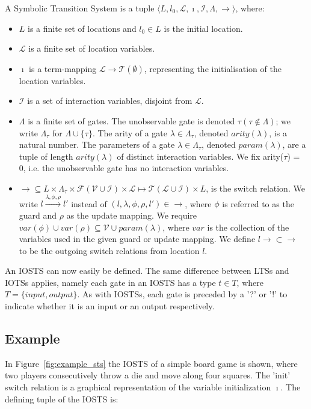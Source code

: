 \begin{definition}
A Symbolic Transition System is a tuple $\langle L,l_0,\mathcal{L},\imath,\mathcal{I},\Lambda,\rightarrow\rangle$, where:
\begin{itemize}
\item $L$ is a finite set of locations and $l_0 \in L$ is the initial location.
\item $\mathcal{L}$ is a finite set of location variables.
\item $\imath$ is a term-mapping $\mathcal{L} \rightarrow \mathcal{T}(\emptyset)$, representing the initialisation of the location variables.
\item $\mathcal{I}$ is a set of interaction variables, disjoint from $\mathcal{L}$.
\item $\Lambda$ is a finite set of gates. The unobservable gate is denoted $\tau (\tau \notin \Lambda)$; we write $\Lambda_\tau$ for $\Lambda \cup \{\tau\}$. The arity of a gate $\lambda\in\Lambda_\tau$, denoted $arity(\lambda)$, is a natural number. The parameters of a gate $\lambda\in\Lambda_\tau$, denoted $param(\lambda)$, are a tuple of length $arity(\lambda)$ of distinct interaction variables. We fix arity($\tau$) = 0, i.e. the unobservable gate has no interaction variables.
\item $\rightarrow \subseteq L \times \Lambda_\tau \times \mathcal{F}(\mathcal{V} \cup \mathcal{I}) \times \mathcal{L} \mapsto \mathcal{T}(\mathcal{L} \cup \mathcal{I}) \times L$, is the switch relation. We write $l\xrightarrow{\lambda,\phi,\rho}l'$ instead of $(l,\lambda,\phi,\rho,l')\in\rightarrow$, where $\phi$ is referred to as the guard and $\rho$ as the update mapping. We require $var(\phi) \cup var(\rho) \subseteq \mathcal{V} \cup param(\lambda)$, where $var$ is the collection of the variables used in the given guard or update mapping. We define $l\rightarrow \subset \rightarrow$ to be the outgoing switch relations from location $l$.
\end{itemize}
\end{definition}

An IOSTS can now easily be defined. The same difference between LTSs and IOTSs applies, namely each gate in an IOSTS has a type $t \in T$, where $T = \{input, output\}$. As with IOSTSs, each gate is preceded by a '?' or '!' to indicate whether it is an input or an output respectively.

\subsection{Example}\label{sec:sts_example}
In Figure~\ref{fig:example_sts} the IOSTS of a simple board game is shown, where two players consecutively throw a die and move along four squares. The 'init' switch relation is a graphical representation of the variable initialization $\imath$. The defining tuple of the IOSTS is:

